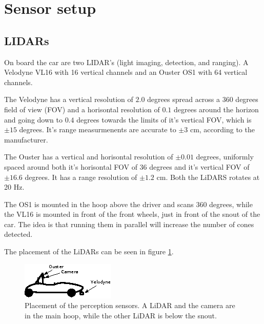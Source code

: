 \section{Sensor setup}
\subsection{LIDARs}

On board the car are two LIDAR's (light imaging, detection, and ranging). A Velodyne VL16 with 16 vertical channels and an Ouster OS1 with 64 vertical channels. 

The Velodyne has a vertical resolution of $2.0$ degrees spread across a $360$ degrees field of view (FOV) and a horisontal resolution of $0.1$ degrees around the horizon and going down to $0.4$ degrees towards the limits of it's vertical FOV, which is $\pm 15$ degrees. It's range measurmenents are accurate to $\pm 3$ cm, according to the manufacturer. 

The Ouster has a vertical and horisontal resolution of $\pm0.01$ degrees, uniformly spaced around both it's horisontal FOV of $36$ degrees and it's vertical FOV of $\pm 16.6$ degrees. It has a range resolution of $\pm 1.2$ cm. Both the LiDARS rotates at 20 Hz. 

The OS1 is mounted in the hoop above the driver and scans $360$ degrees, while the VL16 is mounted in front of the front wheels, just in front of the snout of the car. The idea is that running them in parallel will increase the number of cones detected. 

The placement of the LiDARs can be seen in figure \ref{Fig:SensorPlacementsV2}.


\begin{figure}
    \centering
    \includegraphics[width=0.8\linewidth]{0_Images/4_Implementation/SensorPlacements.eps}
    \caption[Placement of the perception sensors.]{Placement of the perception sensors. A LiDAR and the camera are in the main hoop, while the other LiDAR is below the snout.}
    \label{Fig:SensorPlacementsV2}
\end{figure}

